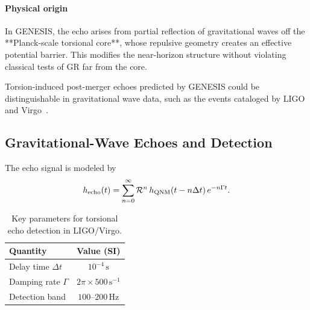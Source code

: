 \documentclass{article}
\begin{document}
\paragraph{Physical origin}

In GENESIS, the echo arises from partial reflection of gravitational waves off the **Planck-scale torsional core**, whose repulsive geometry creates an effective potential barrier. This modifies the near-horizon structure without violating classical tests of GR far from the core.

Torsion-induced post-merger echoes predicted by GENESIS could be distinguishable in gravitational wave data, such as the events cataloged by LIGO and Virgo~\cite{ligo2019}.


\medskip
\begin{center}
\end{center}
\medskip


\subsection{Gravitational-Wave Echoes and Detection}

The echo signal is modeled by
\[
  h_{\rm echo}(t)
  = \sum_{n=0}^\infty \mathcal R^n\,h_{\rm QNM}(t - n\Delta t)\,e^{-n\Gamma t}.
\]
\begin{table}[h]
\centering
\begin{tabular}{l c}
\hline
Quantity                & Value (SI) \\ \hline
Delay time $\Delta t$   & $10^{-4}\,\mathrm s$ \\
Damping rate $\Gamma$   & $2\pi\times500\,\mathrm s^{-1}$ \\
Detection band          & $100$–$200\,$Hz \\
\hline
\end{tabular}
\caption{Key parameters for torsional echo detection in LIGO/Virgo.}
\end{table}
\end{document}
